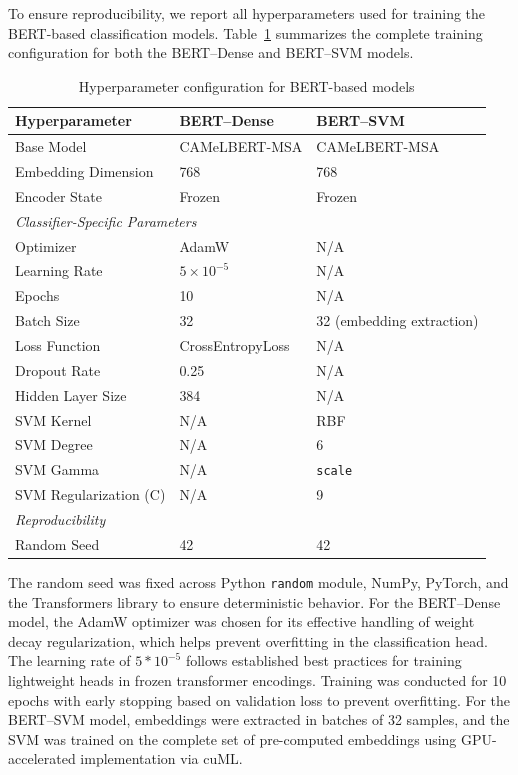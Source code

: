 \documentclass[preprint,12pt,authoryear]{elsarticle}
\begin{document}
To ensure reproducibility, we report all hyperparameters used for training the BERT-based classification models. Table~\ref{tab:hyperparameters} summarizes the complete training configuration for both the BERT–Dense and BERT–SVM models.

\begin{table}[!ht]
\centering
\caption{Hyperparameter configuration for BERT-based models}
\label{tab:hyperparameters}
\small
\begin{tabular}{l l l}
\hline
\textbf{Hyperparameter} & \textbf{BERT–Dense} & \textbf{BERT–SVM} \\
\hline
Base Model & CAMeLBERT-MSA & CAMeLBERT-MSA \\
Embedding Dimension & 768 & 768 \\
Encoder State & Frozen & Frozen \\
\hline
\multicolumn{3}{l}{\textit{Classifier-Specific Parameters}} \\
\hline
Optimizer & AdamW & N/A \\
Learning Rate & $5 \times 10^{-5}$ & N/A \\
Epochs & 10 & N/A \\
Batch Size & 32 & 32 (embedding extraction) \\
Loss Function & CrossEntropyLoss & N/A \\
Dropout Rate & 0.25 & N/A \\
Hidden Layer Size & 384 & N/A \\
SVM Kernel & N/A & RBF \\
SVM Degree & N/A & 6 \\
SVM Gamma & N/A & \texttt{scale} \\
SVM Regularization (C) & N/A & 9 \\
\hline
\multicolumn{3}{l}{\textit{Reproducibility}} \\
\hline
Random Seed & 42 & 42 \\
\hline
\end{tabular}
\end{table}

\noindent
The random seed was fixed across Python \texttt{random} module, NumPy, PyTorch, and the Transformers library to ensure deterministic behavior. For the BERT–Dense model, the AdamW optimizer was chosen for its effective handling of weight decay regularization, which helps prevent overfitting in the classification head. The learning rate of $5*10^{-5}$ follows established best practices for training lightweight heads in frozen transformer encodings. Training was conducted for 10 epochs with early stopping based on validation loss to prevent overfitting. For the BERT–SVM model, embeddings were extracted in batches of 32 samples, and the SVM was trained on the complete set of pre-computed embeddings using GPU-accelerated implementation via cuML.
\end{document}
